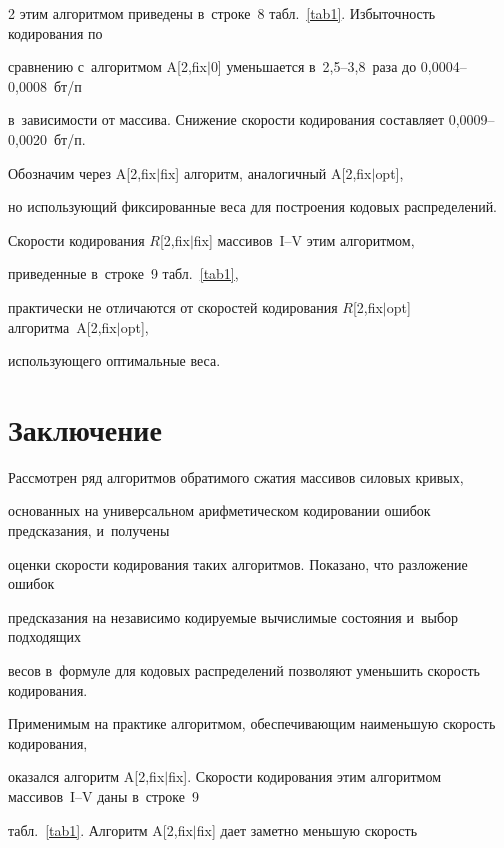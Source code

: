 \begin{multicols}{2}
этим алгоритмом приведены в~строке~8 табл.~\ref{tab1}. Избыточность кодирования по 

сравнению с~алгоритмом A[2,fix$\vert$0] уменьшается в~2,5--3,8~раза до 0,0004--0,0008~бт/п 

в~зависимости от массива. Снижение скорости кодирования составляет 0,0009--0,0020~бт/п.



Обозначим через A[2,fix$\vert$fix] алгоритм, аналогичный A[2,fix$\vert$opt], 

но использующий фиксированные веса для построения кодовых распределений. 

Скорости кодирования $R$[2,fix$\vert$fix] \mbox{массивов~I--V} этим алгоритмом,

 приведенные в~строке~9 табл.~\ref{tab1}, 

практически не отличаются от скоростей кодирования $R$[2,fix$\vert$opt] алгоритма~A[2,fix$\vert$opt], 

использующего оптимальные веса.









\section{Заключение}




Рассмотрен ряд алгоритмов обратимого сжатия массивов силовых кривых, 

основанных на универсальном арифметическом кодировании ошибок предсказания, и~получены 

оценки скорости кодирования таких алгоритмов. Показано, что разложение ошибок 

предсказания на независимо кодируемые вычислимые состояния и~выбор подходящих 

весов в~формуле для кодовых распределений позволяют уменьшить скорость кодирования.



Применимым на практике алгоритмом, обеспечивающим наименьшую скорость кодирования, 

оказался алгоритм A[2,fix$\vert$fix]. Скорости кодирования этим алгоритмом массивов~I--V даны в~строке~9 

табл.~\ref{tab1}. Алгоритм A[2,fix$\vert$fix] дает заметно меньшую скорость


\end{multicols}
